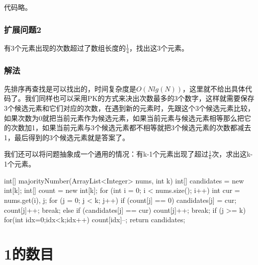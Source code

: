 代码略。
\subsubsection{扩展问题2}
有3个元素出现的次数超过了数组长度的$\frac{1}{4}$，找出这3个元素。

\subsubsection{解法}
先排序再查找是可以找出的，时间复杂度是$O(Nlg(N))$，这里就不给出具体代码了。我们同样也可以采用PK的方式来决出次数最多的3个数字，这样就需要保存3个候选元素和它们对应的次数，在遇到新的元素时，先跟这个3个候选元素比较，
如果次数为0就把当前元素作为候选元素，如果当前元素与候选元素相等那么把它的次数加1，如果当前元素与3个候选元素都不相等就把3个候选元素的次数都减去1，最后得到的3个候选元素就是答案了。

我们还可以将问题抽象成一个通用的情况：有k-1个元素出现了超过$\frac{1}{k}$次，求出这k-1个元素。

\begin{Codex}[label={[$O(N)+O(1)$]Chap02_03_WaterKing.java}]
int[] majorityNumber(ArrayList<Integer> nums, int k) {
    int[] candidates = new int[k];
    int[] count = new int[k];
    for (int i = 0; i < nums.size(); i++) {
        int cur = nums.get(i), j;
        for (j = 0; j < k; j++) {
            if (count[j] == 0) {
                candidates[j] = cur;
                count[j]++;
                break;
            } else if (candidates[j] == cur) {
                count[j]++;
                break;
            }
        }
        if (j >= k) {
            for(int idx=0;idx<k;idx++) {
                count[idx]--;
            }
        }
    }
    return candidates;
}
\end{Codex}


\section{1的数目} %
\label{sec:number-of-ones-in-sequence}

